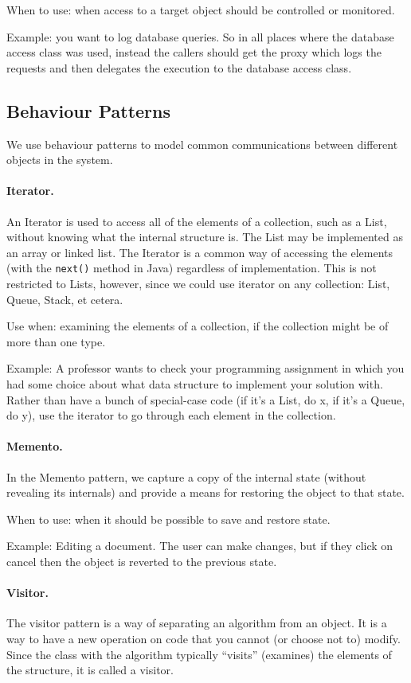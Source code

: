 When to use: when access to a target object should be controlled or monitored.

Example: you want to log database queries. So in all places where the database access class was used, instead the callers should get the proxy which logs the requests and then delegates the execution to the database access class.

\subsection*{Behaviour Patterns}
We use behaviour patterns to model common communications between different objects in the system.

\paragraph{Iterator.}
An Iterator is used to access all of the elements of a collection, such as a List, without knowing what the internal structure is. The List may be implemented as an array or linked list. The Iterator is a common way of accessing the elements (with the \texttt{next()} method in Java) regardless of implementation. This is not restricted to Lists, however, since we could use iterator on any collection: List, Queue, Stack, et cetera.

Use when: examining the elements of a collection, if the collection might be of more than one type.

Example: A professor wants to check your programming assignment in which you had some choice about what data structure to implement your solution with. Rather than have a bunch of special-case code (if it's a List, do x, if it's a Queue, do y), use the iterator to go through each element in the collection.

\paragraph{Memento.}
In the Memento pattern, we capture a copy of the internal state (without revealing its internals) and provide a means for restoring the object to that state. 

When to use: when it should be possible to save and restore state. 

Example: Editing a document. The user can make changes, but if they click on cancel then the object is reverted to the previous state. 

\paragraph{Visitor.}
The visitor pattern is a way of separating an algorithm from an object. It is a way to have a new operation on code that you cannot (or choose not to) modify. Since the class with the algorithm typically ``visits'' (examines) the elements of the structure, it is called a visitor.

